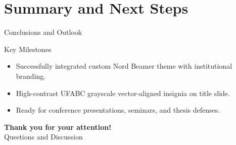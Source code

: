 \documentclass[aspectratio=169, sectionpages, codemintedoverleaf, bibref]{beamer}
\begin{document}
\section{Summary and Next Steps}

\begin{frame}{Conclusions and Outlook}
  \begin{alertblock}{Key Milestones}
    \begin{itemize}
      \item Successfully integrated custom Nord Beamer theme with institutional branding.
      \item High-contrast UFABC grayscale vector-aligned insignia on title slide.
      \item Ready for conference presentations, seminars, and thesis defenses.
    \end{itemize}
  \end{alertblock}
  \vfill
  \centering
  {\Large \textbf{\textcolor{nordEight}{Thank you for your attention!}}}\\[1em]
  {\small Questions and Discussion}
\end{frame}
\end{document}
